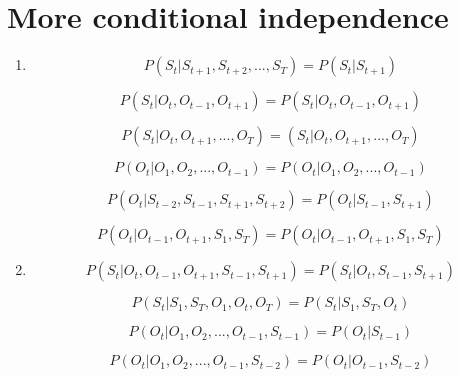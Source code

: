 \documentclass[11]{article}
\begin{document}
\section{More conditional independence}
\begin{enumerate}[label=(\alph*)]
\item
$$P(S_t|S_{t+1},S_{t+2},...,S_T)=P(S_t|S_{t+1})$$

$$P(S_t|O_t,O_{t-1},O_{t+1})=P(S_t|O_t,O_{t-1},O_{t+1})$$

$$P(S_t|O_t,O_{t+1},...,O_T)=(S_t|O_t,O_{t+1},...,O_T)$$

$$P(O_t|O_1,O_2,...,O_{t-1})=P(O_t|O_1,O_2,...,O_{t-1})$$

$$P(O_t|S_{t-2},S_{t-1},S_{t+1},S_{t+2})=P(O_t|S_{t-1},S_{t+1})$$

$$P(O_t|O_{t-1},O_{t+1},S_1,S_T)=P(O_t|O_{t-1},O_{t+1},S_1,S_T)$$

\item
$$P(S_t|O_t,O_{t-1},O_{t+1},S_{t-1},S_{t+1})=P(S_t|O_t,S_{t-1},S_{t+1})$$

$$P(S_t|S_1,S_T,O_1,O_t,O_T)=P(S_t|S_1,S_T,O_t)$$

$$P(O_t|O_1,O_2,...,O_{t-1},S_{t-1})=P(O_t|S_{t-1})$$

$$P(O_t|O_1,O_2,...,O_{t-1},S_{t-2})=P(O_t|O_{t-1},S_{t-2})$$
\end{enumerate}
\end{document}

